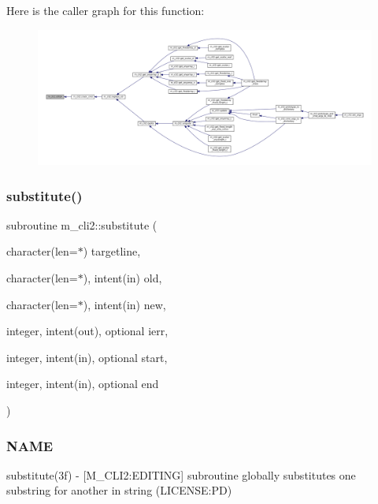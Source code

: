 Here is the caller graph for this function\+:
\nopagebreak
\begin{figure}[H]
\begin{center}
\leavevmode
\includegraphics[width=350pt]{namespacem__cli2_a752fd074abce57e636e4572b3e55db3a_icgraph}
\end{center}
\end{figure}
\mbox{\label{namespacem__cli2_a76af7f7c39e6755e024890d85d488704}} 
\subsubsection{\texorpdfstring{substitute()}{substitute()}}
{\footnotesize\ttfamily subroutine m\+\_\+cli2\+::substitute (\begin{DoxyParamCaption}\item[{character(len=$\ast$)}]{targetline,  }\item[{character(len=$\ast$), intent(in)}]{old,  }\item[{character(len=$\ast$), intent(in)}]{new,  }\item[{integer, intent(out), optional}]{ierr,  }\item[{integer, intent(in), optional}]{start,  }\item[{integer, intent(in), optional}]{end }\end{DoxyParamCaption})\hspace{0.3cm}{\ttfamily [private]}}



\subsubsection*{N\+A\+ME}

substitute(3f) -\/ \mbox{[}M\+\_\+\+C\+L\+I2\+:E\+D\+I\+T\+I\+NG\mbox{]} subroutine globally substitutes one substring for another in string (L\+I\+C\+E\+N\+SE\+:PD) 


